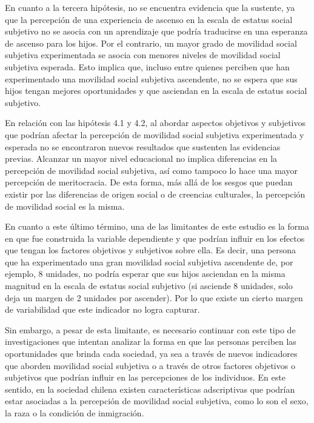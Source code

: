\documentclass[
]{article}
\begin{document}
En cuanto a la tercera hipótesis, no se encuentra evidencia que la
sustente, ya que la percepción de una experiencia de ascenso en la
escala de estatus social subjetivo no se asocia con un aprendizaje que
podría traducirse en una esperanza de ascenso para los hijos. Por el
contrario, un mayor grado de movilidad social subjetiva experimentada se
asocia con menores niveles de movilidad social subjetiva esperada. Esto
implica que, incluso entre quienes perciben que han experimentado una
movilidad social subjetiva ascendente, no se espera que sus hijos tengan
mejores oportunidades y que asciendan en la escala de estatus social
subjetivo.

En relación con las hipótesis 4.1 y 4.2, al abordar aspectos objetivos y
subjetivos que podrían afectar la percepción de movilidad social
subjetiva experimentada y esperada no se encontraron nuevos resultados
que sustenten las evidencias previas. Alcanzar un mayor nivel
educacional no implica diferencias en la percepción de movilidad social
subjetiva, así como tampoco lo hace una mayor percepción de
meritocracia. De esta forma, más allá de los sesgos que puedan existir
por las diferencias de origen social o de creencias culturales, la
percepción de movilidad social es la misma.

En cuanto a este último término, una de las limitantes de este estudio
es la forma en que fue construida la variable dependiente y que podrían
influir en los efectos que tengan los factores objetivos y subjetivos
sobre ella. Es decir, una persona que ha experimentado una gran
movilidad social subjetiva ascendente de, por ejemplo, 8 unidades, no
podría esperar que sus hijos asciendan en la misma magnitud en la escala
de estatus social subjetivo (si asciende 8 unidades, solo deja un margen
de 2 unidades por ascender). Por lo que existe un cierto margen de
variabilidad que este indicador no logra capturar.

Sin embargo, a pesar de esta limitante, es necesario continuar con este
tipo de investigaciones que intentan analizar la forma en que las
personas perciben las oportunidades que brinda cada sociedad, ya sea a
través de nuevos indicadores que aborden movilidad social subjetiva o a
través de otros factores objetivos o subjetivos que podrían influir en
las percepciones de los individuos. En este sentido, en la sociedad
chilena existen características adscriptivas que podrían estar asociadas
a la percepción de movilidad social subjetiva, como lo son el sexo, la
raza o la condición de inmigración.
\end{document}
